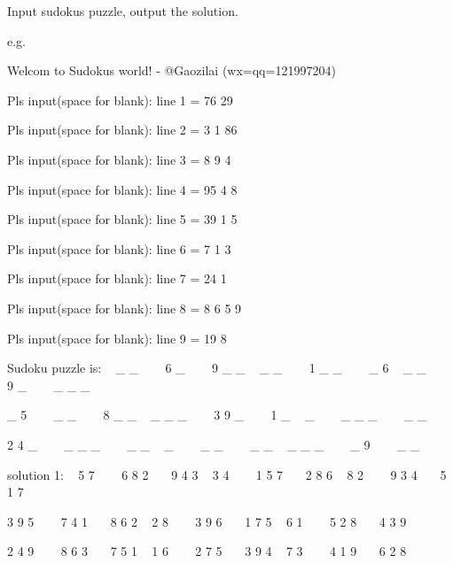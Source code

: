 Input sudoku\textquotesingle{}s puzzle, output the solution.

e.\+g.

Welcom to Sudoku\textquotesingle{}s world! -\/ @\+Gaozilai (wx=qq=121997204)

Pls input(space for blank)\+: line 1 = 76 29

Pls input(space for blank)\+: line 2 = 3 1 86

Pls input(space for blank)\+: line 3 = 8 9 4

Pls input(space for blank)\+: line 4 = 95 4 8

Pls input(space for blank)\+: line 5 = 39 1 5

Pls input(space for blank)\+: line 6 = 7 1 3

Pls input(space for blank)\+: line 7 = 24 1

Pls input(space for blank)\+: line 8 = 8 6 5 9

Pls input(space for blank)\+: line 9 = 19 8

Sudoku puzzle is\+: ~\newline
 \+\_\+ \+\_ ~~~ 6 \+\_ ~~~ 9 \+\_\+ \+\_\+ ~\newline
 \+\_ \+\_\+ ~~~ 1 \+\_\+ \+\_\+ ~~~ \+\_ 6 ~\newline
 \+\_ \+\_\+ ~~~ 9 \+\_ ~~~ \+\_\+ \+\_\+ \+\_\+ ~\newline


\+\_ 5 ~~~ \+\_ \+\_\+ ~~~ 8 \+\_\+ \+\_\+ ~\newline
 \+\_\+ \+\_\+ \+\_\+ ~~~ 3 9 \+\_\+ ~~~ 1 \+\_ ~ \+\_ ~~~ \+\_\+ \+\_\+ \+\_\+ ~~~ \+\_ \+\_\+ ~\newline


2 4 \+\_\+ ~~~ \+\_\+ \+\_\+ \+\_\+ ~~~ \+\_\+ \+\_ ~ \+\_ ~~~ \+\_\+ \+\_ ~~~ \+\_ \+\_\+ ~\newline
 \+\_\+ \+\_\+ \+\_\+ ~~~ \+\_ 9 ~~~ \+\_\+ \+\_ ~\newline


solution 1\+: ~ 5 7 ~~~ 6 8 2~~~ 9 4 3 ~ 3 4 ~~~ 1 5 7~~~ 2 8 6 ~ 8 2 ~~~ 9 3 4~~~ 5 1 7 ~\newline


3 9 5 ~~~ 7 4 1~~~ 8 6 2 ~ 2 8 ~~~ 3 9 6~~~ 1 7 5 ~ 6 1 ~~~ 5 2 8~~~ 4 3 9 ~\newline


2 4 9 ~~~ 8 6 3~~~ 7 5 1 ~ 1 6 ~~~ 2 7 5~~~ 3 9 4 ~ 7 3 ~~~ 4 1 9~~~ 6 2 8 ~\newline
 